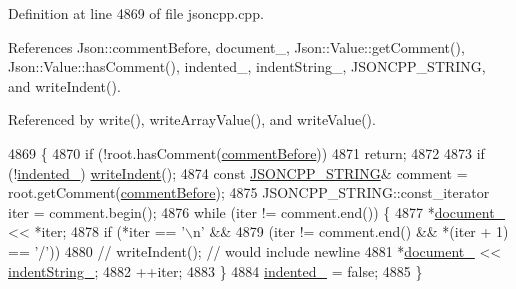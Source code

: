 Definition at line 4869 of file jsoncpp.\+cpp.



References Json\+::comment\+Before, document\+\_\+, Json\+::\+Value\+::get\+Comment(), Json\+::\+Value\+::has\+Comment(), indented\+\_\+, indent\+String\+\_\+, J\+S\+O\+N\+C\+P\+P\+\_\+\+S\+T\+R\+I\+NG, and write\+Indent().



Referenced by write(), write\+Array\+Value(), and write\+Value().


\begin{DoxyCode}
4869                                                                   \{
4870   \textcolor{keywordflow}{if} (!root.hasComment(\hyperlink{namespace_json_a4fc417c23905b2ae9e2c47d197a45351a52f1733775460517b2ea6bedf4906d52}{commentBefore}))
4871     \textcolor{keywordflow}{return};
4872 
4873   \textcolor{keywordflow}{if} (!\hyperlink{class_json_1_1_styled_stream_writer_aa12db1753619a9b48da41f3e45e3275d}{indented\_}) \hyperlink{class_json_1_1_styled_stream_writer_a5a52fa5b406f1580a61dde3b5638e76d}{writeIndent}();
4874   \textcolor{keyword}{const} \hyperlink{json_8h_a1e723f95759de062585bc4a8fd3fa4be}{JSONCPP\_STRING}& comment = root.getComment(\hyperlink{namespace_json_a4fc417c23905b2ae9e2c47d197a45351a52f1733775460517b2ea6bedf4906d52}{commentBefore});
4875   JSONCPP\_STRING::const\_iterator iter = comment.begin();
4876   \textcolor{keywordflow}{while} (iter != comment.end()) \{
4877     *\hyperlink{class_json_1_1_styled_stream_writer_aa8c4e4576f5c3dcb10955d133a092dd6}{document\_} << *iter;
4878     \textcolor{keywordflow}{if} (*iter == \textcolor{charliteral}{'\(\backslash\)n'} &&
4879        (iter != comment.end() && *(iter + 1) == \textcolor{charliteral}{'/'}))
4880       \textcolor{comment}{// writeIndent();  // would include newline}
4881       *\hyperlink{class_json_1_1_styled_stream_writer_aa8c4e4576f5c3dcb10955d133a092dd6}{document\_} << \hyperlink{class_json_1_1_styled_stream_writer_a1481433ebe1491ea83b0beb92aed56c2}{indentString\_};
4882     ++iter;
4883   \}
4884   \hyperlink{class_json_1_1_styled_stream_writer_aa12db1753619a9b48da41f3e45e3275d}{indented\_} = \textcolor{keyword}{false};
4885 \}
\end{DoxyCode}
\mbox{\label{class_json_1_1_styled_stream_writer_a5a52fa5b406f1580a61dde3b5638e76d}} 
